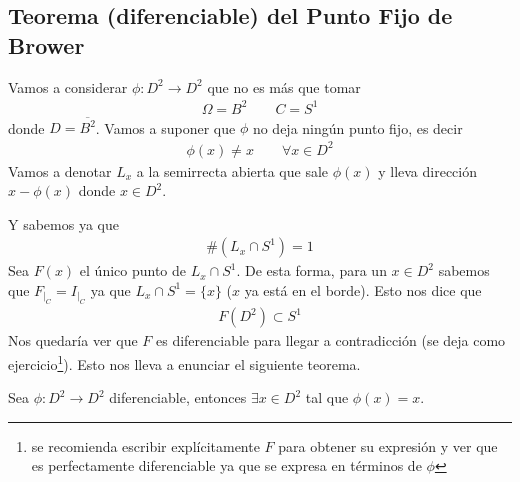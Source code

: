\subsection{Teorema (diferenciable) del Punto Fijo de Brower}
Vamos a considerar $\phi : D^2 \to D^2$ que no es más que tomar
\begin{gather*}
    \Omega = B^2 \qquad C=S^1
\end{gather*}
donde $D = \overline{B^2}$. Vamos a suponer que $\phi$ no deja ningún punto fijo, es decir
\begin{gather*}
    \phi(x) \neq x \qquad \forall x \in D^2
\end{gather*}
Vamos a denotar $L_x$ a la semirrecta abierta que sale $\phi(x)$ y lleva dirección $x-\phi(x)$ donde $x\in D^2$.
\begin{figure}[H]
    \centering
\end{figure}
Y sabemos ya que 
\begin{gather*}
    \#(L_x \cap S^1) = 1
\end{gather*}
Sea $F(x)$ el único punto de $L_x\cap S^1$. De esta forma, para un $x\in D^2$ sabemos que $F_{|_C} = I_{|_C}$ ya que $L_x\cap S^1=\{x\}$ ($x$ ya está en el borde). Esto nos dice que 
\begin{gather*}
    F(D^2) \subset S^1
\end{gather*}
Nos quedaría ver que $F$ es diferenciable para llegar a contradicción (se deja como ejercicio\footnote{se recomienda escribir explícitamente $F$ para obtener su expresión y ver que es perfectamente diferenciable ya que se expresa en términos de $\phi$}). Esto nos lleva a enunciar el siguiente teorema.

\begin{teo}
    Sea $\phi: D^2 \to D^2$ diferenciable, entonces $\exists x\in D^2$ tal que $\phi(x)=x$.
\end{teo}

